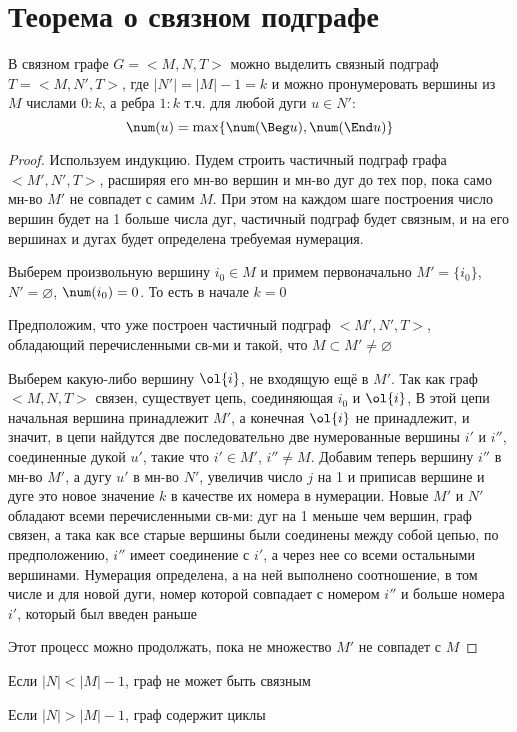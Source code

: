 \documentclass[discrete.tex]{subfiles}
\begin{document}
\section{Теорема о связном подграфе}

\begin{theorem}
    В связном графе $G=<M, N, T>$ можно выделить связный подграф $T=<M, N', T>$, где $|N'| = |M|-1 = k$ и можно пронумеровать вершины из $M$ числами $0:k$, а ребра $1:k$ т.ч. для любой дуги $u \in N'$:
    \[\num(u)=\max\{\num(\Beg u),\num(\End u)\}\]
\end{theorem}

\begin{proof}
  Используем индукцию. Пудем строить частичный подграф графа $<M',N',T>$, расширяя его мн-во вершин и мн-во дуг до тех пор, пока само мн-во $M'$ не совпадет с самим $M$. При этом на каждом шаге построения число вершин будет на 1 больше числа дуг, частичный подграф будет связным, и на его вершинах и дугах будет определена требуемая нумерация.

  Выберем произвольную вершину $i_0 \in M$ и примем первоначально $M' = \{i_0\}$, $N' = \varnothing$, $\num (i_0) = 0$. То есть в начале $k=0$

  Предположим, что уже построен частичный подграф $<M',N',T>$, обладающий перечисленными св-ми и такой, что $M \subset M' \neq \varnothing$

  Выберем какую-либо вершину $\ol{i}$, не входящую ещё в $M'$. Так как граф $<M,N,T>$ связен, существует цепь, соединяющая $i_0$ и $\ol{i}$, В этой цепи начальная вершина принадлежит $M'$, а конечная $\ol{i}$ не принадлежит, и значит, в цепи найдутся две последовательно две нумерованные вершины $i'$ и $i''$, соединенные дукой $u'$, такие что $i' \in M'$, $i'' \neq M$. Добавим теперь вершину $i''$ в мн-во $M'$, а дугу $u'$ в мн-во $N'$, увеличив число $j$ на 1 и приписав вершине и дуге это новое значение $k$ в качестве их номера в нумерации. Новые $M'$ и $N'$ обладают всеми перечисленными св-ми: дуг на 1 меньше чем вершин, граф связен, а така как все старые вершины были соединены между собой цепью, по предположению, $i''$ имеет соединение с $i'$, а через нее со всеми остальными вершинами. Нумерация определена, а на ней выполнено соотношение, в том числе и для новой дуги, номер которой совпадает с номером $i''$ и больше номера $i'$, который был введен раньше

  Этот процесс можно продолжать, пока не множество $M'$ не совпадет с $M$
\end{proof}

\begin{consquence}
  Если $|N| < |M| - 1$, граф не может быть связным
\end{consquence}

\begin{consquence}
  Если $|N| > |M| - 1$, граф содержит циклы
\end{consquence}
\end{document}
